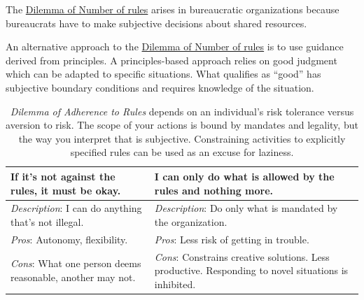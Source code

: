 The \hyperref[table:dilemma-personal-number-of-rules]{Dilemma of Number of rules}
%
%
arises in bureaucratic organizations because bureaucrats have to make subjective decisions about shared resources. 


An alternative approach to the  \hyperref[table:dilemma-personal-number-of-rules]{Dilemma of Number of rules}
is to use guidance derived from principles. A principles-based approach relies on good judgment which can be adapted to specific situations. What qualifies as ``good'' has subjective boundary conditions and requires knowledge of the situation.



\begin{center}
\begin{table}[H] %
\begin{tabular}{ | m{\dilemmatablewidth}| m{\dilemmatablewidth} | } 
  \hline
  \textbf{If it's not against the rules, it must be okay.} & 
  \textbf{I can only do what is allowed by the rules and nothing more.} \\ 
  \hline
  \textit{Description}: I can do anything that's not illegal. &
  \textit{Description}: Do only what is mandated by the organization. \\
  \hline
  \textit{Pros}: Autonomy, flexibility. &
  \textit{Pros}: Less risk of getting in trouble. \\
  \hline
  \textit{Cons}: What one person deems reasonable, another may not. & 
  \textit{Cons}: Constrains creative solutions. Less productive. Responding to novel situations is inhibited. \\  
  \hline
\end{tabular}
\caption{
\textit{Dilemma of Adherence to Rules} depends on an individual's risk tolerance versus aversion to risk. 
The scope of your actions is bound by mandates and legality, but the way you interpret that is subjective. 
Constraining activities to explicitly specified rules can be used as an excuse for laziness. 
}
\label{table:dilemma-personal-rule-adherence}
\end{table}
\end{center}

